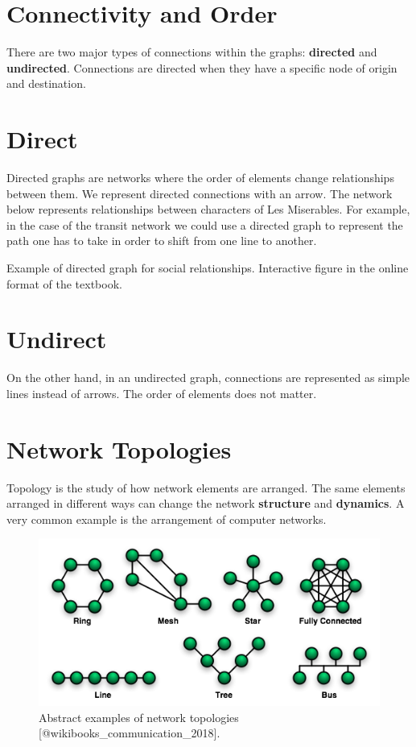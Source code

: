 \documentclass[
]{book}
\begin{document}
\hypertarget{connectivity-and-order}{%
\section{Connectivity and Order}\label{connectivity-and-order}}

There are two major types of connections within the graphs: \textbf{directed} and \textbf{undirected}. Connections are directed when they have a specific node of origin and destination.

\hypertarget{direct}{%
\section{Direct}\label{direct}}

Directed graphs are networks where the order of elements change relationships between them. We represent directed connections with an arrow. The network below represents relationships between characters of Les Miserables. For example, in the case of the transit network we could use a directed graph to represent the path one has to take in order to shift from one line to another.

\label{fig:8-directed-graph}Example of directed graph for social relationships. Interactive figure in the online format of the textbook.

\hypertarget{undirect}{%
\section{Undirect}\label{undirect}}

On the other hand, in an undirected graph, connections are represented as simple lines instead of arrows. The order of elements does not matter.

\hypertarget{network-topologies}{%
\section{Network Topologies}\label{network-topologies}}

Topology is the study of how network elements are arranged. The same elements arranged in different ways can change the network \textbf{structure} and \textbf{dynamics}. A very common example is the arrangement of computer networks.

\begin{figure}
\includegraphics[width=0.8\linewidth]{images/08-network_topologies} \caption{Abstract examples of network topologies [@wikibooks_communication_2018].}\label{fig:8-network-topologies}
\end{figure}
\end{document}

